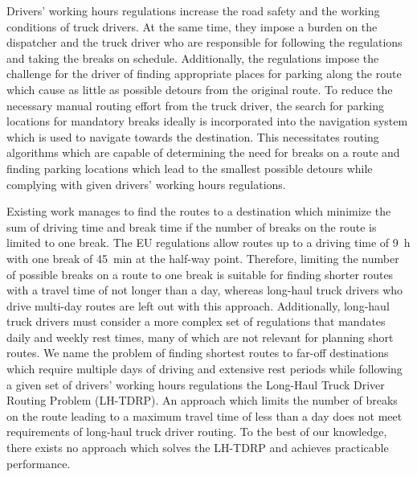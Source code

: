 Drivers' working hours regulations increase the road safety and the working conditions of truck drivers. At the same time, they impose a burden on the dispatcher and the truck driver who are responsible for following the regulations and taking the breaks on schedule. Additionally, the regulations impose the challenge for the driver of finding appropriate places for parking along the route which cause as little as possible detours from the original route. To reduce the necessary manual routing effort from the truck driver, the search for parking locations for mandatory breaks ideally is incorporated into the navigation system which is used to navigate towards the destination. This necessitates routing algorithms which are capable of determining the need for breaks on a route and finding parking locations which lead to the smallest possible detours while complying with given drivers' working hours regulations.

Existing work manages to find the routes to a destination which minimize the sum of driving time and break time if the number of breaks on the route is limited to one break. The EU regulations allow routes up to a driving time of \SI{9}{\hour} with one break of \SI{45}{\minute} at the half-way point. Therefore, limiting the number of possible breaks on a route to one break is suitable for finding shorter routes with a travel time of not longer than a day, whereas long-haul truck drivers who drive multi-day routes are left out with this approach. Additionally, long-haul truck drivers must consider a more complex set of regulations that mandates daily and weekly rest times, many of which are not relevant for planning short routes. We name the problem of finding shortest routes to far-off destinations which require multiple days of driving and extensive rest periods while following a given set of drivers' working hours regulations the Long-Haul Truck Driver Routing Problem (LH-TDRP). An approach which limits the number of breaks on the route leading to a maximum travel time of less than a day does not meet requirements of long-haul truck driver routing. To the best of our knowledge, there exists no approach which solves the LH-TDRP and achieves practicable performance.

